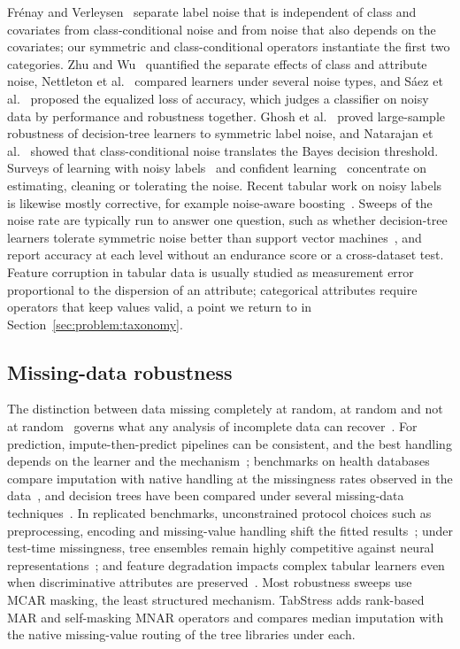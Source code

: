 \documentclass[pdflatex,sn-mathphys]{sn-jnl}
\theoremstyle{thmstyleone}
\theoremstyle{thmstyletwo}
\theoremstyle{thmstylethree}
\begin{document}
Fr\'enay and Verleysen~\cite{frenay2014classification} separate label noise that is independent of class and covariates from class-conditional noise and from noise that also depends on the covariates; our symmetric and class-conditional operators instantiate the first two categories. Zhu and Wu~\cite{zhu2004class} quantified the separate effects of class and attribute noise, Nettleton et al.~\cite{nettleton2010study} compared learners under several noise types, and S\'aez et al.~\cite{saez2015evaluating} proposed the equalized loss of accuracy, which judges a classifier on noisy data by performance and robustness together. Ghosh et al.~\cite{ghosh2017robustness} proved large-sample robustness of decision-tree learners to symmetric label noise, and Natarajan et al.~\cite{natarajan2013learning} showed that class-conditional noise translates the Bayes decision threshold. Surveys of learning with noisy labels~\cite{song2023learning} and confident learning~\cite{northcutt2021confident} concentrate on estimating, cleaning or tolerating the noise. Recent tabular work on noisy labels is likewise mostly corrective, for example noise-aware boosting~\cite{ye2026itboost}. Sweeps of the noise rate are typically run to answer one question, such as whether decision-tree learners tolerate symmetric noise better than support vector machines~\cite{ghosh2017robustness}, and report accuracy at each level without an endurance score or a cross-dataset test. Feature corruption in tabular data is usually studied as measurement error proportional to the dispersion of an attribute; categorical attributes require operators that keep values valid, a point we return to in Section~\ref{sec:problem:taxonomy}.

\subsection{Missing-data robustness}\label{sec:related:missing}

The distinction between data missing completely at random, at random and not at random~\cite{rubin1976inference} governs what any analysis of incomplete data can recover~\cite{little2019statistical}. For prediction, impute-then-predict pipelines can be consistent, and the best handling depends on the learner and the mechanism~\cite{josse2024consistency,lemorvan2021whats}; benchmarks on health databases compare imputation with native handling at the missingness rates observed in the data~\cite{perezlebel2022benchmarking}, and decision trees have been compared under several missing-data techniques~\cite{twala2008good}. In replicated benchmarks, unconstrained protocol choices such as preprocessing, encoding and missing-value handling shift the fitted results~\cite{bischl2021openml,mcelfresh2023when}; under test-time missingness, tree ensembles remain highly competitive against neural representations~\cite{lemorvan2021whats,mcelfresh2023when}; and feature degradation impacts complex tabular learners even when discriminative attributes are preserved~\cite{borisov2024deep,hollmann2023tabpfn}. Most robustness sweeps use MCAR masking, the least structured mechanism. TabStress adds rank-based MAR and self-masking MNAR operators and compares median imputation with the native missing-value routing of the tree libraries under each.
\end{document}
